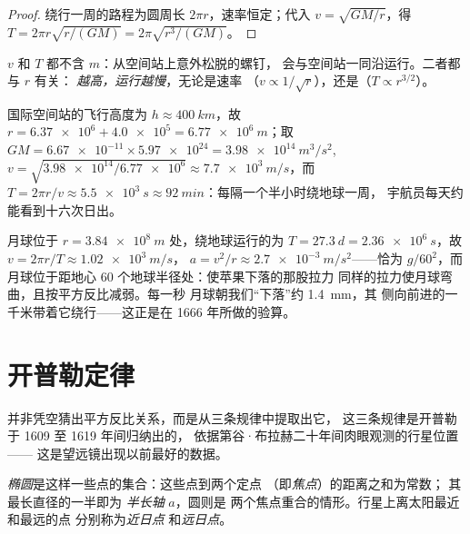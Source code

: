 \begin{proof}
绕行一周的路程为圆周长 $2\pi r$，速率恒定；代入
$v = \sqrt{GM/r}$，得 $T = 2\pi r\sqrt{r/(GM)} = 2\pi\sqrt{r^3/(GM)}$。
\end{proof}

$v$ 和 $T$ 都不含 $m$：从空间站上意外松脱的螺钉，
会与空间站一同沿运行。二者都与 $r$ 有关：
\emph{越高，运行越慢}，无论是速率
（$v \propto 1/\sqrt r$），还是（$T \propto r^{3/2}$）。

\begin{example}[空间站]\label{ex:g12:satellites-kepler:iss}
国际空间站的飞行高度为
$h \approx \qty{400}{km}$，故 $r = \num{6.37e6} + \num{4.0e5} =
\qty{6.77e6}{m}$；取 $GM = \num{6.67e-11} \times \num{5.97e24} =
\qty{3.98e14}{m^3/s^2}$, $v = \sqrt{\num{3.98e14}/\num{6.77e6}}
\approx \qty{7.7e3}{m/s}$，而 $T = 2\pi r/v \approx \qty{5.5e3}{s}
\approx \qty{92}{min}$：每隔一个半小时绕地球一周，
宇航员每天约能看到十六次日出。
\end{example}

\begin{example}[月球像苹果一样下落]\label{ex:g12:satellites-kepler:moon}
月球位于 $r = \qty{3.84e8}{m}$ 处，绕地球运行的为 $T = \qty{27.3}{d} =
\qty{2.36e6}{s}$，故 $v = 2\pi r/T \approx \qty{1.02e3}{m/s}$，
$a = v^2/r \approx \qty{2.7e-3}{m/s^2}$——恰为 $g/60^2$，而
月球位于距地心 $60$ 个地球半径处：使苹果下落的那股拉力
同样的拉力使月球弯曲，且按平方反比减弱。每一秒
月球朝我们“下落”约 \qty{1.4}{mm}，其
侧向前进的一千米带着它绕行——这正是在 1666 年所做的验算。
\end{example}

\section{开普勒定律}

并非凭空猜出平方反比关系，而是从三条规律中提取出它，
这三条规律是开普勒于 1609 至 1619 年间归纳出的，
依据第谷·布拉赫二十年间肉眼观测的行星位置——
这是望远镜出现以前最好的数据。

\begin{definition}[椭圆]\label{def:g12:satellites-kepler:ellipse}
\emph{椭圆}是这样一些点的集合：这些点到两个定点
（即\emph{焦点}）的距离之和为常数；
其最长直径的一半即为
\emph{半长轴} $a$，圆则是
两个焦点重合的情形。行星上离太阳最近和最远的点
分别称为\emph{近日点}
和\emph{远日点}。
\end{definition}

